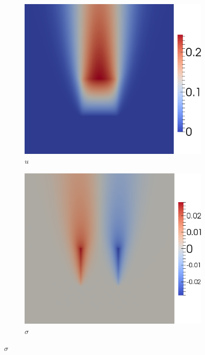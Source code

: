 \documentclass[preprint,12pt]{elsarticle}
\begin{document}
\begin{figure}[p]
\centering
\begin{subfigure}[t]{0.45\textwidth}
\centering
\includegraphics[width=\textwidth]{SpaceTimeHeat/PulseSource/u.png}
\caption{$u$}
\label{fig:spaceTimeHeatu}
\end{subfigure}
\begin{subfigure}[t]{0.45\textwidth}
\centering
\includegraphics[width=\textwidth]{SpaceTimeHeat/PulseSource/sigma.png}
\caption{$\sigma$}
\label{fig:spaceTimeHeatsigma}

\end{subfigure}
\end{figure}
\end{document}
